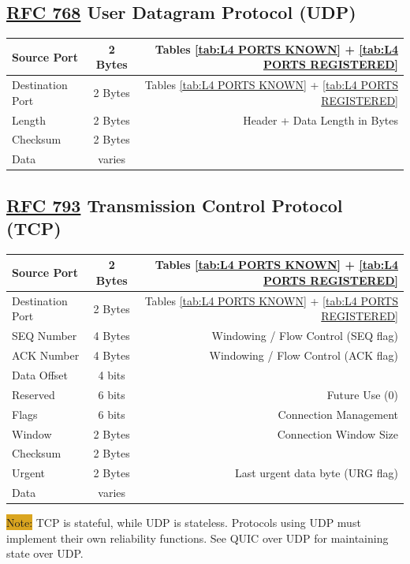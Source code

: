 \documentclass[12pt]{article}
\newcommand{\note}[1]{\colorbox{#1}{Note:}}
\newcommand{\RFC}[1]{\href{https://datatracker.ietf.org/doc/html/rfc#1}{RFC #1}}
\begin{document}
	\subsection{\RFC{768} User Datagram Protocol (UDP) \label{subsec:UDP}}
	\begin{table}[H]
	\centering
	\begin{tabular}{| l | c | r |}
	\hline
	Source Port		& 2 Bytes	& Tables \ref{tab:L4 PORTS KNOWN} + \ref{tab:L4 PORTS REGISTERED}\\\hline
	Destination Port	& 2 Bytes	& Tables \ref{tab:L4 PORTS KNOWN} + \ref{tab:L4 PORTS REGISTERED}\\\hline
	Length		& 2 Bytes	& Header + Data Length in Bytes\\\hline
	Checksum		& 2 Bytes	&\\\hline
	Data			& varies	&\\\hline
	\end{tabular}\end{table}


	\subsection{\RFC{793} Transmission Control Protocol (TCP) \label{subsec:TCP}}
	\begin{table}[H]
	\centering
	\begin{tabular}{| l | c | r |}
	\hline
	Source Port		& 2 Bytes	& Tables \ref{tab:L4 PORTS KNOWN} + \ref{tab:L4 PORTS REGISTERED}\\\hline
	Destination Port	& 2 Bytes	& Tables \ref{tab:L4 PORTS KNOWN} + \ref{tab:L4 PORTS REGISTERED}\\\hline
	SEQ Number	& 4 Bytes	& Windowing / Flow Control (SEQ flag)\\\hline
	ACK Number	& 4 Bytes	& Windowing / Flow Control (ACK flag)\\\hline
	Data Offset		& 4 bits	&\\\hline
	Reserved		& 6 bits	& Future Use (0)\\\hline
	Flags			& 6 bits	& Connection Management\\\hline
	Window		& 2 Bytes	& Connection Window Size\\\hline
	Checksum		& 2 Bytes	&\\\hline
	Urgent		& 2 Bytes	& Last urgent data byte (URG flag)\\\hline
	Data			& varies	&\\\hline
	\end{tabular}\end{table}
	\note{Goldenrod} TCP is stateful, while UDP is stateless. Protocols using UDP must implement their own reliability functions. See QUIC over UDP for maintaining state over UDP.
\end{document}
